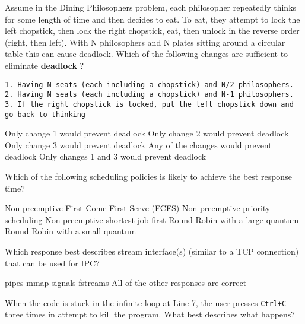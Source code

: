 \variant
Assume in the Dining Philosophers problem, each philosopher repeatedly thinks for some length of time and then decides to eat. To eat, they attempt to lock the left chopstick, then lock the right chopstick, eat, then unlock in the reverse order (right, then left). With N philosophers and N plates sitting around a circular table this can cause deadlock. Which of the following changes are sufficient to eliminate \textbf{deadlock} ? 

\begin{verbatim}
1. Having N seats (each including a chopstick) and N/2 philosophers.
2. Having N seats (each including a chopstick) and N-1 philosophers.
3. If the right chopstick is locked, put the left chopstick down and go back to thinking
\end{verbatim}

\begin{answers}
\answer Only change 1 would prevent deadlock
\answer Only change 2 would prevent deadlock
\answer Only change 3 would prevent deadlock
\correctanswer Any of the changes would prevent deadlock
\answer Only changes 1 and 3 would prevent deadlock
\end{answers}
\begin{solution}
\end{solution}

\variant
Which of the following scheduling policies is likely to achieve the best response time?
\begin{answers}
\answer Non-preemptive First Come First Serve (FCFS)
\answer Non-preemptive priority scheduling
\answer Non-preemptive shortest job first
\answer Round Robin with a large quantum
\correctanswer Round Robin with a small quantum
\end{answers}
\begin{solution}
\end{solution}


\variant
Which response best describes stream interface(s) (similar to a TCP connection) that can be used for IPC?
\begin{answers}
\correctanswer pipes
\answer mmap
\answer signals
\answer fstreams
\answer All of the other responses are correct
\end{answers}
\begin{solution}
\end{solution}



\variant
When the code is stuck in the infinite loop at Line 7, the user presses {\tt Ctrl+C} three times in attempt to kill the program.  What best describes what happens?

